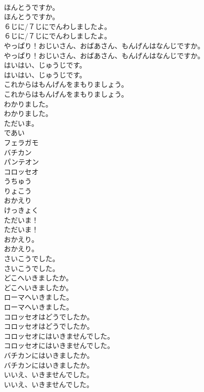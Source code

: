 \documentclass[8pt]{extreport}
\begin{document}
\begin{CJK}{UTF8}{min}
\\	ほんとうですか。	
\\	ほんとうですか。 
\\	６じに/７じにでんわしましたよ。	
\\	６じに/７じにでんわしましたよ。 
\\	やっぱり！おじいさん、おばあさん、もんげんはなんじですか。	
\\	やっぱり！おじいさん、おばあさん、もんげんはなんじですか。 
\\	はいはい、じゅうじです。	
\\	はいはい、じゅうじです。 
\\	これからはもんげんをまもりましょう。	
\\	これからはもんげんをまもりましょう。 
\\	わかりました。	
\\	わかりました。 
\\	ただいま。
\\	であい
\\	フェラガモ
\\	バチカン
\\	パンテオン
\\	コロッセオ
\\	うちゅう
\\	りょこう
\\	おかえり
\\	けっきょく
\\	ただいま！	
\\	ただいま！ 
\\	おかえり。	
\\	おかえり。 
\\	さいこうでした。	
\\	さいこうでした。 
\\	どこへいきましたか。	
\\	どこへいきましたか。 
\\	ローマへいきました。	
\\	ローマへいきました。 
\\	コロッセオはどうでしたか。	
\\	コロッセオはどうでしたか。 
\\	コロッセオにはいきませんでした。	
\\	コロッセオにはいきませんでした。 
\\	バチカンにはいきましたか。	
\\	バチカンにはいきましたか。 
\\	いいえ、いきませんでした。	
\\	いいえ、いきませんでした。 

\end{CJK}
\end{document}
